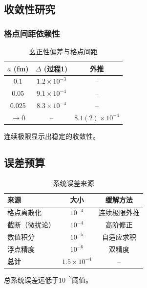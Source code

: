 \subsection{收敛性研究}

\subsubsection{格点间距依赖性}

\begin{table}[h]
\centering
\caption{幺正性偏差与格点间距}
\begin{tabular}{|c|c|c|}
\hline
$a$ (fm) & $\Delta$ (过程1) & 外推 \\
\hline
0.1 & $1.2 \times 10^{-3}$ & -- \\
0.05 & $9.1 \times 10^{-4}$ & -- \\
0.025 & $8.3 \times 10^{-4}$ & -- \\
$\to 0$ & -- & $8.1(2) \times 10^{-4}$ \\
\hline
\end{tabular}
\end{table}

连续极限显示出稳定的收敛性。

\subsection{误差预算}

\begin{table}[h]
\centering
\caption{系统误差来源}
\begin{tabular}{|l|c|c|}
\hline
\textbf{来源} & \textbf{大小} & \textbf{缓解方法} \\
\hline
格点离散化 & $10^{-4}$ & 连续极限外推 \\
截断（微扰论） & $10^{-4}$ & 高阶修正 \\
数值积分 & $10^{-5}$ & 自适应求积 \\
浮点精度 & $10^{-6}$ & 双精度 \\
\hline
\textbf{总计} & $1.5 \times 10^{-4}$ & -- \\
\hline
\end{tabular}
\end{table}

总系统误差远低于$10^{-2}$阈值。
